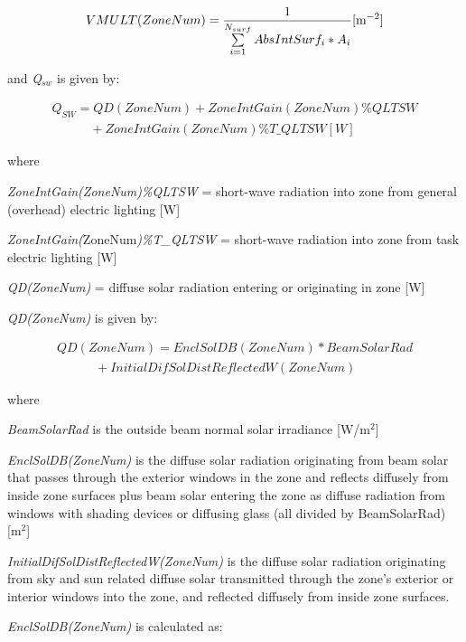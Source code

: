 \begin{equation}
VMULT(ZoneNum) = \frac{1}{{\sum\limits_{i = 1}^{{N_{surf}}} {AbsIntSur{f_i}*{A_i}} }}{\rm{    [}}{{\rm{m}}^{{\rm{ - 2}}}}]
\end{equation}

and \emph{Q\(_{sw}\)} is given by:

\begin{equation}
\begin{array}{l}
{Q_{SW}} = QD(ZoneNum) + ZoneIntGain(ZoneNum)\% QLTSW \\
\quad \quad \quad + ZoneIntGain(ZoneNum)\% T\_QLTSW [W]
\end{array}
\end{equation}

where

\emph{ZoneIntGain(ZoneNum)\%QLTSW} = short-wave radiation into zone from general (overhead) electric lighting {[}W{]}

\emph{ZoneIntGain(}ZoneNum\emph{)\%T\_QLTSW} = short-wave radiation into zone from task electric lighting {[}W{]}

\emph{QD(ZoneNum)} = diffuse solar radiation entering or originating in zone {[}W{]}

\emph{QD(ZoneNum)} is given by:

\begin{equation}
\begin{array}{l}
QD(ZoneNum) = EnclSolDB(ZoneNum)*BeamSolarRad \\
\quad \quad \quad + InitialDifSolDistReflectedW(ZoneNum)
\end{array}
\end{equation}

where

\emph{BeamSolarRad} is the outside beam normal solar irradiance {[}W/m\(^{2}\){]}

\emph{EnclSolDB(ZoneNum)} is the diffuse solar radiation originating from beam solar that passes through the exterior windows in the zone and reflects diffusely from inside zone surfaces plus beam solar entering the zone as diffuse radiation from windows with shading devices or diffusing glass (all divided by BeamSolarRad)~~ {[}m\(^{2}\){]}

\emph{InitialDifSolDistReflectedW(ZoneNum)} is the diffuse solar radiation originating from sky and sun related diffuse solar transmitted through the zone's exterior or interior windows into the zone, and reflected diffusely from inside zone surfaces.

\emph{EnclSolDB(ZoneNum)} is calculated as:

